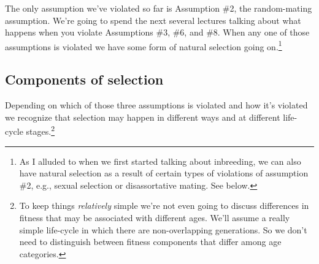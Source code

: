 The only assumption we've violated so far is Assumption \#2, the
random-mating assumption. We're going to spend the next several
lectures talking about what happens when you violate Assumptions \#3,
\#6, and \#8. When any one of those assumptions is violated we have
some form of natural selection going on.\footnote{As I alluded to when
  we first started talking about inbreeding, we can also have natural
  selection as a result of certain types of violations of assumption
  \#2, e.g., sexual selection or disassortative mating. See
  below.}

\subsection*{Components of selection}

Depending on which of those three assumptions is violated and how it's
violated we recognize that selection may happen in different ways and
at different life-cycle stages.\footnote{To keep things {\it
    relatively\/} simple we're not even going to discuss differences
  in fitness that may be associated with different ages. We'll assume
  a really simple life-cycle in which there are non-overlapping
  generations. So we don't need to distinguish between fitness
  components that differ among age categories.}

